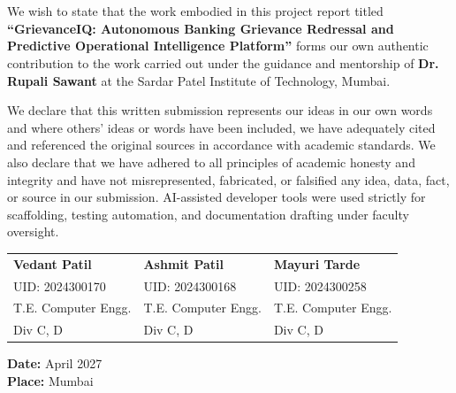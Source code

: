 \documentclass[12pt,singleside,a4paper]{article}
\begin{document}





\newpage
\section*{}
\vspace{2.0cm}

We wish to state that the work embodied in this project report titled \textbf{``GrievanceIQ: Autonomous Banking Grievance Redressal and Predictive Operational Intelligence Platform''} forms our own authentic contribution to the work carried out under the guidance and mentorship of \textbf{Dr. Rupali Sawant} at the Sardar Patel Institute of Technology, Mumbai. 

We declare that this written submission represents our ideas in our own words and where others' ideas or words have been included, we have adequately cited and referenced the original sources in accordance with academic standards. We also declare that we have adhered to all principles of academic honesty and integrity and have not misrepresented, fabricated, or falsified any idea, data, fact, or source in our submission. AI-assisted developer tools were used strictly for scaffolding, testing automation, and documentation drafting under faculty oversight.

\vspace{3.5cm}

\noindent
\begin{tabular}{p{5cm}p{5cm}p{5cm}}
\textbf{Vedant Patil} & \textbf{Ashmit Patil} & \textbf{Mayuri Tarde} \\
UID: 2024300170 & UID: 2024300168 & UID: 2024300258 \\
T.E. Computer Engg. & T.E. Computer Engg. & T.E. Computer Engg. \\
Div C, D & Div C, D & Div C, D \\
\end{tabular}

\vspace{1.5cm}
\noindent \textbf{Date:} April 2027 \\
\textbf{Place:} Mumbai

\pagebreak

\end{document}
